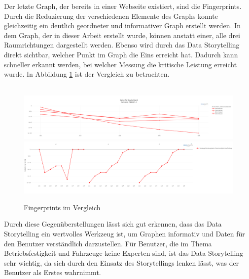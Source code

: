 \noindent
Der letzte Graph, der bereits in einer Webseite existiert, sind die Fingerprints. Durch die Reduzierung der verschiedenen Elemente des Graphs konnte gleichzeitig ein deutlich geordneter und informativer Graph erstellt werden. In dem Graph, der in dieser Arbeit erstellt wurde, können anstatt einer, alle drei Raumrichtungen dargestellt werden. Ebenso wird durch das Data Storytelling direkt sichtbar, welcher Punkt im Graph die Eins erreicht hat. Dadurch kann schneller erkannt werden, bei welcher Messung die kritische Leistung erreicht wurde. In Abbildung \ref{fig:fingerprints_compare} ist der Vergleich zu betrachten.\\\\ 
\begin{figure}[!h]
    \centering
    \includegraphics[width=1\linewidth]{gfx/fingerprints_old.png}
        \includegraphics[width=1\linewidth]{gfx/fingerprints_new.png}
    \caption{Fingerprints im Vergleich}
    \label{fig:fingerprints_compare}
\end{figure}
\noindent
Durch diese Gegenüberstellungen lässt sich gut erkennen, dass das Data Storytelling ein wertvolles Werkzeug ist, um Graphen informativ und Daten für den Benutzer verständlich darzustellen. Für Benutzer, die im Thema Betriebsfestigkeit und Fahrzeuge keine Experten sind, ist das Data Storytelling sehr wichtig, da sich durch den Einsatz des Storytellings lenken lässt, was der Benutzer als Erstes wahrnimmt.  
